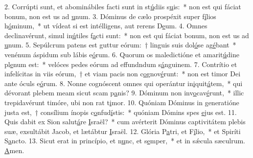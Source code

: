 2. Corrúpti sunt, et abominábiles facti sunt in st\uline{ú}diis s\uline{u}is:~* non est qui fáciat bonum, non est us ad \uline{u}num.
3. Dóminus de cælo prospéxit super f\uline{í}lios h\uline{ó}minum,~* ut vídeat si est intélligens, aut rerens D\uline{e}um.
4. Omnes declinavérunt, simul in\uline{ú}tiles f\uline{a}cti sunt:~* non est qui fáciat bonum, non est us ad \uline{u}num.
5. Sepúlcrum patens est guttur eórum:~† linguis suis dol\uline{ó}se ag\uline{é}bant~* venénum áspidum sub lábis e\uline{ó}rum.
6. Quorum os maledictióne et amarit\uline{ú}dine pl\uline{e}num est:~* velóces pedes eórum ad effundndum s\uline{á}nguinem.
7. Contrítio et infelícitas in viis eórum,~† et viam pacis non c\uline{o}gnov\uline{é}runt:~* non est timor Dei ante óculs e\uline{ó}rum.
8. Nonne cognóscent omnes qui operántur in\uline{i}quit\uline{á}tem,~* qui dévorant plebem meam sicut scam p\uline{a}nis?
9. Dóminum non inv\uline{o}cav\uline{é}runt,~* illic trepidavérunt timóre, ubi non rat t\uline{i}mor.
10. Quóniam Dóminus in generatióne justa est,~† consílium ínopis c\uline{o}nfud\uline{í}stis:~* quóniam Dómins spes \uline{e}jus est.
11. Quis dabit ex Sion salut\uline{á}re \uline{I}sraël?~* cum avérterit Dóminus captivitátem plebis suæ, exsultábit Jacob, et lætábtur \uline{I}sraël.
12. Glória P\uline{a}tri, et F\uline{í}lio,~* et Spiríti S\uline{a}ncto.
13. Sicut erat in princípio, et n\uline{u}nc, et s\uline{e}mper,~* et in sǽcula sæculrum. \uline{A}men.
